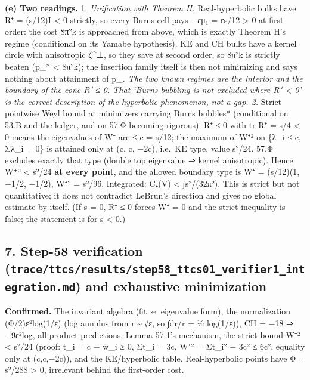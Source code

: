 \documentclass[
  10pt,
]{report}
\begin{document}
\textbf{(e) Two readings.} 1. \emph{Unification with Theorem H.}
Real-hyperbolic bulks have R⁺ = (s/12)I \textless{} 0 strictly, so every
Burns cell pays −εμ₁ = ε\textbar s\textbar/12 \textgreater{} 0 at first
order: the cost 8π²k is approached from above, which is exactly Theorem
H's regime (conditional on its Yamabe hypothesis). KE and CH bulks have
a kernel circle with anisotropic ζ\^{}⊥, so they save at second order,
so 8π²k is strictly beaten (p\_* \textless{} 8π²k); the insertion family
itself is then not minimizing and says nothing about attainment of
p\_\emph{. The two known regimes are the interior and the boundary of
the cone R⁺ ≤ 0. That `Burns bubbling is not excluded where R⁺
\textless{} 0' is the correct description of the hyperbolic phenomenon,
not a gap. 2. }Strict pointwise Weyl bound at minimizers carrying Burns
bubbles* (conditional on 53.B and the ledger, and on 57.Φ becoming
rigorous). R⁺ ≤ 0 with tr R⁺ = s/4 \textless{} 0 means the eigenvalues
of W⁺ are ≤ c = \textbar s\textbar/12; the maximum of
\textbar W⁺\textbar² on \{λ\_i ≤ c, Σλ\_i = 0\} is attained only at (c,
c, −2c), i.e.~KE type, value s²/24. 57.Φ excludes exactly that type
(double top eigenvalue ⇒ kernel anisotropic). Hence \textbar W⁺\textbar²
\textless{} s²/24 \textbf{at every point}, and the allowed boundary type
is W⁺ = (\textbar s\textbar/12)(1, −1/2, −1/2), \textbar W⁺\textbar² =
s²/96. Integrated: C₊(V) \textless{} ∫s²/(32π²). This is strict but not
quantitative; it does not contradict LeBrun's direction and gives no
global estimate by itself. (If s = 0, R⁺ ≤ 0 forces W⁺ = 0 and the
strict inequality is false; the statement is for s \textless{} 0.)

\hypertarget{step-58-verification-tracettcsresultsstep58_ttcs01_verifier1_integration.md-and-exhaustive-minimization}{%
\subsection{\texorpdfstring{7. Step-58 verification
(\texttt{trace/ttcs/results/step58\_ttcs01\_verifier1\_integration.md})
and exhaustive
minimization}{7. Step-58 verification (trace/ttcs/results/step58\_ttcs01\_verifier1\_integration.md) and exhaustive minimization}}\label{step-58-verification-tracettcsresultsstep58_ttcs01_verifier1_integration.md-and-exhaustive-minimization}}

\textbf{Confirmed.} The invariant algebra (fit ⇔ eigenvalue form), the
normalization (Φ/2)ε²log(1/ε) (log annulus from r \textasciitilde{} √ε,
so ∫dr/r = ½ log(1/ε)), CH = −18 ⇒ −9ε²log, all product predictions,
Lemma 57.1's mechanism, the strict bound \textbar W⁺\textbar²
\textless{} s²/24 (proof: t\_i = c − w\_i ≥ 0, Σt\_i = 3c,
\textbar W⁺\textbar² = Σt\_i² − 3c² ≤ 6c², equality only at (c,c,−2c)),
and the KE/hyperbolic table. Real-hyperbolic points have Φ = s²/288
\textgreater{} 0, irrelevant behind the first-order cost.
\end{document}
